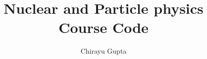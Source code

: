 \documentclass{scrartcl}
\title{ Nuclear and Particle physics \\ \large{ Course Code } }
\author{Chirayu Gupta}
\date{}
\begin{document}
\maketitle
\section{}
\end{document}
